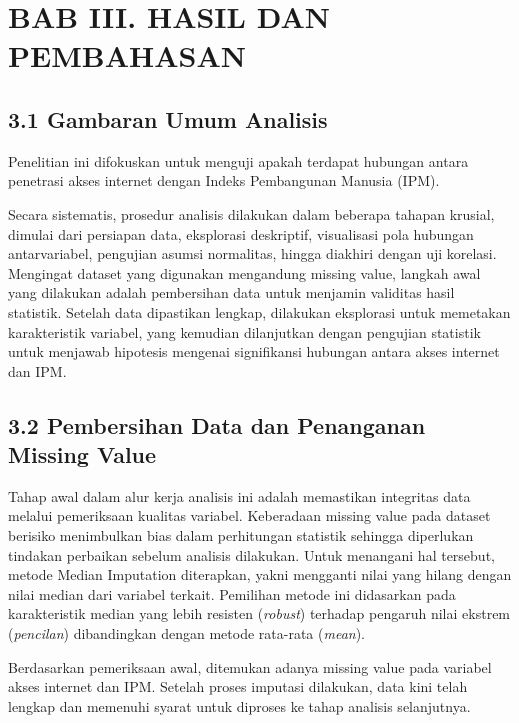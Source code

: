 \documentclass[
  indonesian,
  letterpaper,
  DIV=11,
  numbers=noendperiod]{scrartcl}
\begin{document}
\section{BAB III. HASIL DAN
PEMBAHASAN}\label{bab-iii.-hasil-dan-pembahasan}

\subsection{3.1 Gambaran Umum Analisis}\label{gambaran-umum-analisis}

Penelitian ini difokuskan untuk menguji apakah terdapat hubungan antara
penetrasi akses internet dengan Indeks Pembangunan Manusia (IPM).

Secara sistematis, prosedur analisis dilakukan dalam beberapa tahapan
krusial, dimulai dari persiapan data, eksplorasi deskriptif, visualisasi
pola hubungan antarvariabel, pengujian asumsi normalitas, hingga
diakhiri dengan uji korelasi. Mengingat dataset yang digunakan
mengandung missing value, langkah awal yang dilakukan adalah pembersihan
data untuk menjamin validitas hasil statistik. Setelah data dipastikan
lengkap, dilakukan eksplorasi untuk memetakan karakteristik variabel,
yang kemudian dilanjutkan dengan pengujian statistik untuk menjawab
hipotesis mengenai signifikansi hubungan antara akses internet dan IPM.~

\subsection{3.2 Pembersihan Data dan Penanganan Missing
Value}\label{pembersihan-data-dan-penanganan-missing-value}

Tahap awal dalam alur kerja analisis ini adalah memastikan integritas
data melalui pemeriksaan kualitas variabel. Keberadaan missing value
pada dataset berisiko menimbulkan bias dalam perhitungan statistik
sehingga diperlukan tindakan perbaikan sebelum analisis dilakukan. Untuk
menangani hal tersebut, metode Median Imputation diterapkan, yakni
mengganti nilai yang hilang dengan nilai median dari variabel terkait.
Pemilihan metode ini didasarkan pada karakteristik median yang lebih
resisten (\emph{robust}) terhadap pengaruh nilai ekstrem
(\emph{pencilan}) dibandingkan dengan metode rata-rata (\emph{mean}).~

Berdasarkan pemeriksaan awal, ditemukan adanya missing value pada
variabel akses internet dan IPM. Setelah proses imputasi dilakukan, data
kini telah lengkap dan memenuhi syarat untuk diproses ke tahap analisis
selanjutnya.
\end{document}
